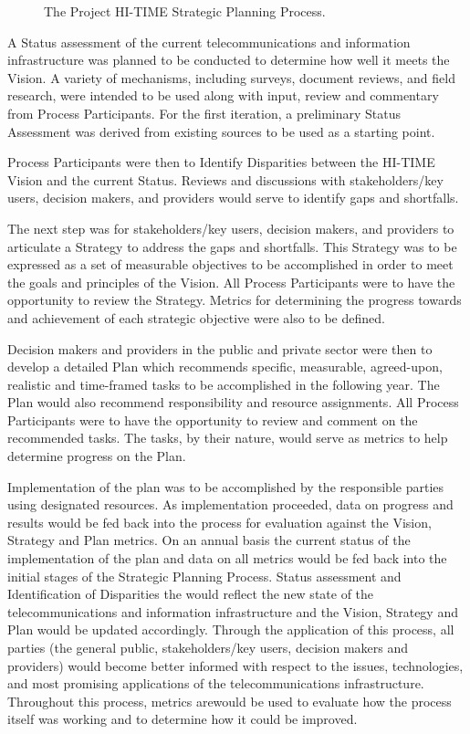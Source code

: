 \begin{figure*}[htbp]
  \centerline{} 
\caption{The Project HI-TIME Strategic Planning Process.}
\label{fig:hi-time-flow}
\end{figure*}


A Status assessment of the current telecommunications and information 
infrastructure was planned to be conducted to determine how well it meets the 
Vision.  A variety of mechanisms, including surveys, document reviews, 
and field research, were intended to be used along with input, review and commentary 
from Process Participants.  For the first iteration, a preliminary 
Status Assessment was derived from existing sources to be used as a starting 
point.

Process Participants were then to Identify Disparities between the HI-TIME 
Vision and the current Status.  Reviews and discussions with 
stakeholders/key users, decision makers, and providers would serve to identify 
gaps and shortfalls.

The next step was for stakeholders/key users, decision makers, and 
providers to articulate a Strategy to address the gaps and shortfalls. 
This Strategy was to be expressed as a set of measurable objectives to be 
accomplished in order to meet the goals and principles of the Vision.  
All Process Participants were to have the opportunity to review the Strategy.  
Metrics for determining the progress towards and achievement of each 
strategic objective were also to be defined.

Decision makers and providers in the public and private sector were then 
to develop a detailed Plan which recommends specific, measurable, 
agreed-upon, realistic and time-framed tasks to be accomplished in the 
following year.  The Plan would also recommend responsibility and resource 
assignments.  All Process Participants were to have the opportunity to review 
and comment on the recommended tasks.  The tasks, by their nature, would serve 
as metrics to help determine progress on the Plan.

Implementation of the plan was to be accomplished by the responsible parties 
using designated resources.  As implementation proceeded, data on 
progress and results would be fed back into the process for evaluation 
against the Vision, Strategy and Plan metrics.  On an annual basis the 
current status of the implementation of the plan and data on all metrics 
would be fed back into the initial stages of the Strategic Planning Process.  
Status assessment and Identification of Disparities the would reflect the new 
state of the telecommunications and information infrastructure and the 
Vision, Strategy and Plan would be updated accordingly.  Through the 
application of this process, all parties (the general public, 
stakeholders/key users, decision makers and providers) would become better 
informed with respect to the issues, technologies, and most promising 
applications of the telecommunications infrastructure.  Throughout this 
process, metrics arewould be used to evaluate how the process itself was working 
and to determine how it could be improved.



